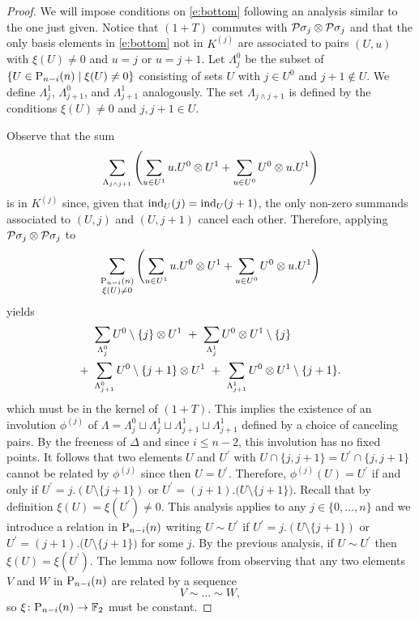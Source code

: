 \begin{proof}
	We will impose conditions on \eqref{e:bottom} following an analysis similar to the one just given.
	Notice that $(1+T)$ commutes with $\cP\sigma_j \otimes \cP\sigma_j$ and that the only basis elements in \eqref{e:bottom} not in $K^{(j)}$ are associated to pairs $(U, u)$ with $\xi(U) \neq 0$ and $u = j$ or $ u = j+1$.
	Let $\Lambda_{j}^0$ be the subset of $\{U \in \P_{n-i}(n) \mid \xi(U) \neq 0\}$ consisting of sets $U$ with $j \in U^0$ and $j+1 \notin U$.
	We define $\Lambda_{j}^1$, $\Lambda_{j+1}^0$, and $\Lambda_{j+1}^1$ analogously.
	The set $\Lambda_{j \wedge j+1}$ is defined by the conditions $\xi(U) \neq 0$ and $j,j+1 \in U$.

	Observe that the sum
	\[
	\sum_{\Lambda_{j \wedge j+1}} \left( \sum_{u \in U^1} {u.U^0} \ot {U^1} +
	\sum_{u \in U^0} {U^0} \ot {u.U^1} \right)
	\]
	is in $K^{(j)}$ since, given that $\ind_U(j) = \ind_U(j+1)$, the only non-zero summands associated to $(U,j)$ and $(U,j+1)$ cancel each other.
	Therefore, applying $\cP\sigma_j \otimes \cP\sigma_j$ to
	\[
	\sum_{\substack{\P_{n-i}(n) \\ \xi(U) \neq 0}} \left(\sum_{u \in U^1} {u.U^0} \ot {U^1} +
	\sum_{u \in U^0} {U^0} \ot {u.U^1} \right)
	\]
	yields
	\begin{align*}
	&\sum_{\Lambda_{j}^0} U^0 \setminus \{j\} \ot {U^1} \ + \
	\sum_{\Lambda_{j}^1} U^0  \ot {U^1} \setminus \{j\} \\ + \
	&\sum_{\Lambda_{j+1}^0} U^0 \setminus \{j+1\} \ot {U^1} \ + \
	\sum_{\Lambda_{j+1}^1} U^0 \ot {U^1} \setminus \{j+1\}.
	\end{align*}
	which must be in the kernel of $(1+T)$.
	This implies the existence of an involution $\phi^{(j)}$ of $\Lambda = \Lambda^0_{j} \sqcup \Lambda^1_{j} \sqcup \Lambda^1_{j+1} \sqcup \Lambda^1_{j+1}$ defined by a choice of canceling pairs.
	By the freeness of $\Delta$ and since $i \leq n-2$, this involution has no fixed points.
	It follows that two elements $U$ and $U^\prime$ with $U \cap \{j, j+1\} = U^\prime \cap \{j, j+1\}$ cannot be related by $\phi^{(j)}$ since then $U = U^\prime$.
	Therefore, $\phi^{(j)}(U) = U^\prime$ if and only if $U^\prime = j.(U \setminus \{j+1\})$ or $U^\prime = (j+1).\big( U \setminus \{j+1\} \big)$.
	Recall that by definition $\xi(U) = \xi(U^\prime) \neq 0$.
	This analysis applies to any $j \in \{0, \dots, n\}$ and we introduce a relation in $\P_{n-i}(n)$ writing $U \sim U^\prime$ if $U^\prime = j.(U \setminus \{j+1\})$ or $U^\prime = (j+1).\big( U \setminus \{j+1\} \big)$ for some $j$.
	By the previous analysis, if $U \sim U^\prime$ then $\xi(U) = \xi(U^\prime)$.
	The lemma now follows from observing that any two elements $V$ and $W$ in $\P_{n-i}(n)$ are related by a sequence
	\[
	V \sim \dots \sim W,
	\]
	so $\xi \colon \P_{n-i}(n) \to \F$ must be constant.
\end{proof}


